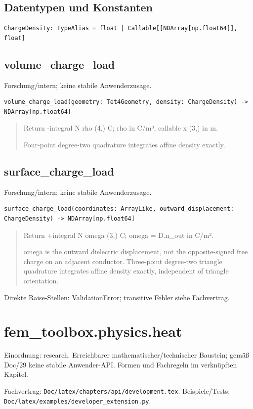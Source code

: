 \subsection*{Datentypen und Konstanten}
\begin{lstlisting}
ChargeDensity: TypeAlias = float | Callable[[NDArray[np.float64]], float]
\end{lstlisting}
\subsection{volume\_charge\_load}
Forschung/intern; keine stabile Anwenderzusage.
\begin{lstlisting}
volume_charge_load(geometry: Tet4Geometry, density: ChargeDensity) -> NDArray[np.float64]
\end{lstlisting}
\begin{quote}
Return -integral N rho (4,) C; rho in C/m³, callable x (3,) in m.\par Four-point degree-two quadrature integrates affine density exactly.
\end{quote}
\subsection{surface\_charge\_load}
Forschung/intern; keine stabile Anwenderzusage.
\begin{lstlisting}
surface_charge_load(coordinates: ArrayLike, outward_displacement: ChargeDensity) -> NDArray[np.float64]
\end{lstlisting}
\begin{quote}
Return +integral N omega (3,) C; omega = D.n\_out in C/m².\par omega is the outward dielectric displacement, not the opposite-signed free charge on an adjacent conductor. Three-point degree-two triangle quadrature integrates affine density exactly, independent of triangle orientation.
\end{quote}
Direkte Raise-Stellen: ValidationError; transitive Fehler siehe Fachvertrag.
\section{fem\_toolbox.physics.heat}
Einordnung: research. Erreichbarer mathematischer/technischer Baustein; gemäß Doc/29 keine stabile Anwender-API. Formen und Fachregeln im verknüpften Kapitel.
\par Fachvertrag: \nolinkurl{Doc/latex/chapters/api/development.tex}. Beispiele/Tests:
\nolinkurl{Doc/latex/examples/developer_extension.py}.
